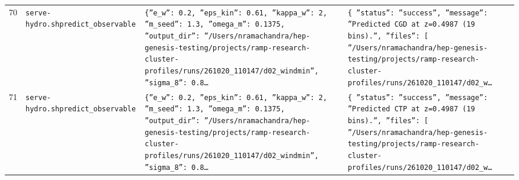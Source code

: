 \documentclass[11pt,a4paper]{article}
\begin{document}
\begin{longtable}{@{}p{}p{}p{}p{}@{}}
70 & \texttt{serve-hydro.sh}\newline\texttt{predict\_\allowbreak{}observable} & \texttt{\{''e\_\allowbreak{}w'':\allowbreak{} 0.2,\allowbreak{} ''eps\_\allowbreak{}kin'':\allowbreak{} 0.61,\allowbreak{} ''kappa\_\allowbreak{}w'':\allowbreak{} 2,\allowbreak{} ''m\_\allowbreak{}seed'':\allowbreak{} 1.3,\allowbreak{} ''omega\_\allowbreak{}m'':\allowbreak{} 0.1375,\allowbreak{} ''output\_\allowbreak{}dir'':\allowbreak{} ''/\allowbreak{}Users/\allowbreak{}nramachandra/\allowbreak{}hep-genesis-testing/\allowbreak{}projects/\allowbreak{}ramp-research-cluster-profiles/\allowbreak{}runs/\allowbreak{}261020\_\allowbreak{}110147/\allowbreak{}d02\_\allowbreak{}windmin'',\allowbreak{} ''sigma\_\allowbreak{}8'':\allowbreak{} 0.8\ldots{}\allowbreak{}} & \texttt{\{   ''status'':\allowbreak{} ''success'',\allowbreak{}   ''message'':\allowbreak{} ''Predicted CGD at z=\allowbreak{}0.4987 (19 bins)\allowbreak{}.'',\allowbreak{}   ''files'':\allowbreak{} [     ''/\allowbreak{}Users/\allowbreak{}nramachandra/\allowbreak{}hep-genesis-testing/\allowbreak{}projects/\allowbreak{}ramp-research-cluster-profiles/\allowbreak{}runs/\allowbreak{}261020\_\allowbreak{}110147/\allowbreak{}d02\_\allowbreak{}w\ldots{}\allowbreak{}} \\
71 & \texttt{serve-hydro.sh}\newline\texttt{predict\_\allowbreak{}observable} & \texttt{\{''e\_\allowbreak{}w'':\allowbreak{} 0.2,\allowbreak{} ''eps\_\allowbreak{}kin'':\allowbreak{} 0.61,\allowbreak{} ''kappa\_\allowbreak{}w'':\allowbreak{} 2,\allowbreak{} ''m\_\allowbreak{}seed'':\allowbreak{} 1.3,\allowbreak{} ''omega\_\allowbreak{}m'':\allowbreak{} 0.1375,\allowbreak{} ''output\_\allowbreak{}dir'':\allowbreak{} ''/\allowbreak{}Users/\allowbreak{}nramachandra/\allowbreak{}hep-genesis-testing/\allowbreak{}projects/\allowbreak{}ramp-research-cluster-profiles/\allowbreak{}runs/\allowbreak{}261020\_\allowbreak{}110147/\allowbreak{}d02\_\allowbreak{}windmin'',\allowbreak{} ''sigma\_\allowbreak{}8'':\allowbreak{} 0.8\ldots{}\allowbreak{}} & \texttt{\{   ''status'':\allowbreak{} ''success'',\allowbreak{}   ''message'':\allowbreak{} ''Predicted CTP at z=\allowbreak{}0.4987 (19 bins)\allowbreak{}.'',\allowbreak{}   ''files'':\allowbreak{} [     ''/\allowbreak{}Users/\allowbreak{}nramachandra/\allowbreak{}hep-genesis-testing/\allowbreak{}projects/\allowbreak{}ramp-research-cluster-profiles/\allowbreak{}runs/\allowbreak{}261020\_\allowbreak{}110147/\allowbreak{}d02\_\allowbreak{}w\ldots{}\allowbreak{}} \\

\end{longtable}
\end{document}
